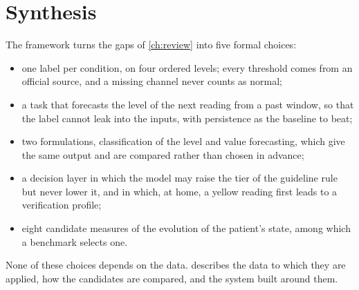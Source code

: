\section{Synthesis}\label{sec:framework-synthesis}

The framework turns the gaps of \cref{ch:review} into five formal choices:
\begin{itemize}
  \item one label per condition, on four ordered levels; every threshold comes from an official source, and a missing channel never counts as normal;
  \item a task that forecasts the level of the next reading from a past window, so that the label cannot leak into the inputs, with persistence as the baseline to beat;
  \item two formulations, classification of the level and value forecasting, which give the same output and are compared rather than chosen in advance;
  \item a decision layer in which the model may raise the tier of the guideline rule but never lower it, and in which, at home, a yellow reading first leads to a verification profile;
  \item eight candidate measures of the evolution of the patient's state, among which a benchmark selects one.
\end{itemize}
None of these choices depends on the data.  describes the data to which they are applied, how the candidates are compared, and the system built around them.
